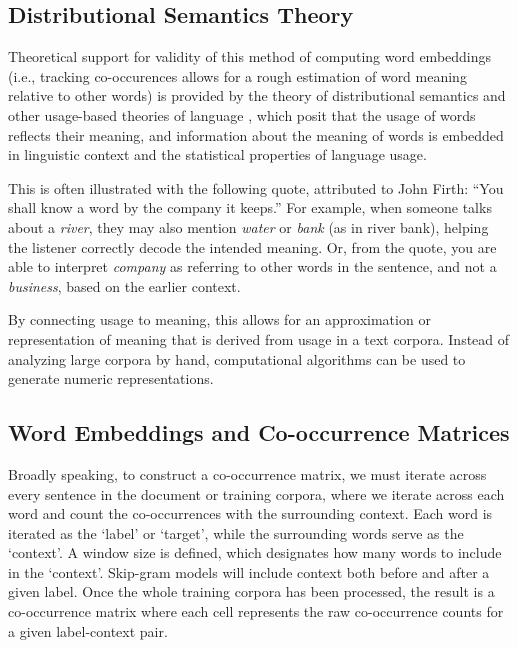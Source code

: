  
\subsection{Distributional Semantics Theory}

Theoretical support for validity of this method of computing word embeddings (i.e., tracking co-occurences allows for a rough estimation of word meaning relative to other words) is provided by the theory of distributional semantics \cite{harris1954distributional, firth1957synopsis} and other usage-based theories of language \cite{wittgenstein1953philosophical}, which posit that the usage of words reflects their meaning, and information about the meaning of words is embedded in linguistic context and the statistical properties of language usage.

This is often illustrated with the following quote, attributed to John Firth: ``You shall know a word by the company it keeps.'' For example, when someone talks about a \textit{river}, they may also mention \textit{water} or \textit{bank} (as in river bank), helping the listener correctly decode the intended meaning. Or, from the quote, you are able to interpret \textit{company} as referring to other words in the sentence, and not a \textit{business}, based on the earlier context.

By connecting usage to meaning, this allows for an approximation or representation of meaning that is derived from usage in a text corpora. Instead of analyzing large corpora by hand, computational algorithms can be used to generate numeric representations.

\subsection{Word Embeddings and Co-occurrence Matrices}

Broadly speaking, to construct a co-occurrence matrix, we must iterate across every sentence in the document or training corpora, where we iterate across each word and count the co-occurrences with the surrounding context. Each word is iterated as the `label' or `target', while the surrounding words serve as the `context'. A window size is defined, which designates how many words to include in the `context'. Skip-gram models will include context both before and after a given label. Once the whole training corpora has been processed, the result is a co-occurrence matrix where each cell represents the raw co-occurrence counts for a given label-context pair.

